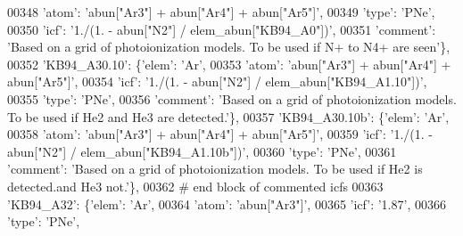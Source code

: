 \begin{DoxyCode}
00348                                      \textcolor{stringliteral}{'atom'}: \textcolor{stringliteral}{'abun["Ar3"] + abun["Ar4"] + abun["Ar5"]'},
00349                                      \textcolor{stringliteral}{'type'}: \textcolor{stringliteral}{'PNe'},
00350                                      \textcolor{stringliteral}{'icf'}: \textcolor{stringliteral}{'1./(1. - abun["N2"] / elem\_abun["KB94\_A0"])'},
00351                                       \textcolor{stringliteral}{'comment'}: \textcolor{stringliteral}{'Based on a grid of photoionization models. To be used if
       N+ to N4+ are seen'}\},
00352                          \textcolor{stringliteral}{'KB94\_A30.10'}: \{\textcolor{stringliteral}{'elem'}: \textcolor{stringliteral}{'Ar'},
00353                                      \textcolor{stringliteral}{'atom'}: \textcolor{stringliteral}{'abun["Ar3"] + abun["Ar4"] + abun["Ar5"]'},
00354                                      \textcolor{stringliteral}{'icf'}: \textcolor{stringliteral}{'1./(1. - abun["N2"] / elem\_abun["KB94\_A1.10"])'},
00355                                      \textcolor{stringliteral}{'type'}: \textcolor{stringliteral}{'PNe'},
00356                                       \textcolor{stringliteral}{'comment'}: \textcolor{stringliteral}{'Based on a grid of photoionization models. To be used if
       He2 and He3 are detected.'}\},
00357                          \textcolor{stringliteral}{'KB94\_A30.10b'}: \{\textcolor{stringliteral}{'elem'}: \textcolor{stringliteral}{'Ar'},
00358                                      \textcolor{stringliteral}{'atom'}: \textcolor{stringliteral}{'abun["Ar3"] + abun["Ar4"] + abun["Ar5"]'},
00359                                      \textcolor{stringliteral}{'icf'}: \textcolor{stringliteral}{'1./(1. - abun["N2"] / elem\_abun["KB94\_A1.10b"])'},
00360                                      \textcolor{stringliteral}{'type'}: \textcolor{stringliteral}{'PNe'},
00361                                       \textcolor{stringliteral}{'comment'}: \textcolor{stringliteral}{'Based on a grid of photoionization models. To be used if
       He2 is detected.and He3 not.'}\},
00362 \textcolor{comment}{# end block of commented icfs}
00363                          \textcolor{stringliteral}{'KB94\_A32'}: \{\textcolor{stringliteral}{'elem'}: \textcolor{stringliteral}{'Ar'},
00364                                      \textcolor{stringliteral}{'atom'}: \textcolor{stringliteral}{'abun["Ar3"]'},
00365                                      \textcolor{stringliteral}{'icf'}: \textcolor{stringliteral}{'1.87'},
00366                                      \textcolor{stringliteral}{'type'}: \textcolor{stringliteral}{'PNe'},

\end{DoxyCode}
